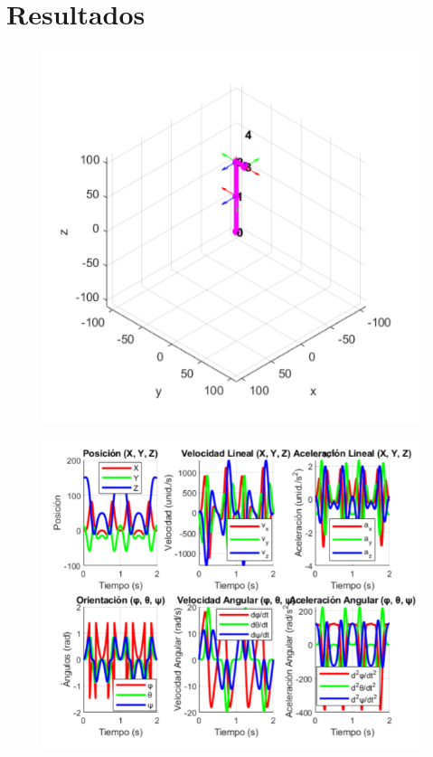 

\chapter{Resultados} \label{chap:resultados}

\begin{figure}[H]  %
	\centering
	\includegraphics[width=0.7\linewidth]{img/grafica1directa}
	\caption{}
	\label{fig:grafica1directa}
\end{figure}

\begin{figure}[H]
	\centering
	\includegraphics[width=0.7\linewidth]{img/imagen2directa}
	\caption{}
	\label{fig:imagen2directa}
\end{figure}
